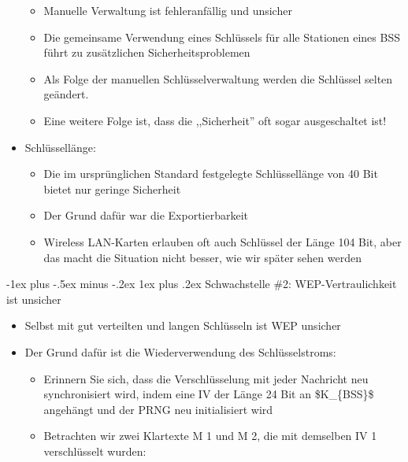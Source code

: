 \documentclass[a4paper]{article}
\makeatletter
\renewcommand{\subsubsection}{\@startsection{subsubsection}{3}{0mm}%
 {-1ex plus -.5ex minus -.2ex}%
 {1ex plus .2ex}%
 {\normalfont\small\bfseries}}
\makeatother
\begin{document}
\begin{multicols}{3}
\begin{itemize}
              \begin{itemize}
                  \item
                        Manuelle Verwaltung ist fehleranfällig und unsicher
                  \item
                        Die gemeinsame Verwendung eines Schlüssels für alle Stationen eines
                        BSS führt zu zusätzlichen Sicherheitsproblemen
                  \item
                        Als Folge der manuellen Schlüsselverwaltung werden die Schlüssel
                        selten geändert.
                  \item
                        Eine weitere Folge ist, dass die ,,Sicherheit'' oft sogar
                        ausgeschaltet ist!
              \end{itemize}
        \item
              Schlüssellänge:

              \begin{itemize}
                  \item
                        Die im ursprünglichen Standard festgelegte Schlüssellänge von 40 Bit
                        bietet nur geringe Sicherheit
                  \item
                        Der Grund dafür war die Exportierbarkeit
                  \item
                        Wireless LAN-Karten erlauben oft auch Schlüssel der Länge 104 Bit,
                        aber das macht die Situation nicht besser, wie wir später sehen
                        werden
              \end{itemize}
    \end{itemize}


    \subsubsection{Schwachstelle \#2: WEP-Vertraulichkeit ist
        unsicher}

    \begin{itemize}
        \item
              Selbst mit gut verteilten und langen Schlüsseln ist WEP unsicher
        \item
              Der Grund dafür ist die Wiederverwendung des Schlüsselstroms:

              \begin{itemize}
                  \item
                        Erinnern Sie sich, dass die Verschlüsselung mit jeder Nachricht neu
                        synchronisiert wird, indem eine IV der Länge 24 Bit an
                        \$K\_\{BSS\}\$ angehängt und der PRNG neu initialisiert wird
                  \item
                        Betrachten wir zwei Klartexte M 1 und M 2, die mit demselben IV 1
                        verschlüsselt wurden:


\end{itemize}
\end{itemize}
\end{multicols}
\end{document}

